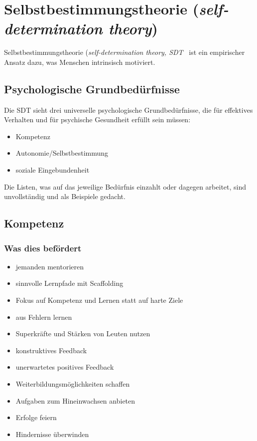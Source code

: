 \section{Selbstbestimmungstheorie (\emph{self-determination theory})}
\label{sdt}

Selbstbestimmungstheorie (\emph{self-determination theory, SDT}~\cite{self-determiniation-theory} ist ein empirischer Ansatz dazu, was Menschen intrinsisch motiviert.


\subsection{Psychologische Grundbedürfnisse}

Die SDT sieht drei universelle psychologische Grundbedürfnisse, die für effektives Verhalten und für psychische Gesundheit erfüllt sein müssen:

\begin{itemize}
  \item Kompetenz
  \item Autonomie/Selbstbestimmung
  \item soziale Eingebundenheit
\end{itemize}

Die Listen, was auf das jeweilige Bedürfnis einzahlt oder dagegen arbeitet, sind unvollständig und als Beispiele gedacht.


\subsection{Kompetenz}

\subsubsection{Was dies befördert}

\begin{itemize}
  \item jemanden mentorieren
  \item sinnvolle Lernpfade mit \glqq Scaffolding\grqq
  \item Fokus auf Kompetenz und Lernen statt auf harte Ziele
  \item aus Fehlern lernen
  \item Superkräfte und Stärken von Leuten nutzen
  \item konstruktives Feedback
  \item unerwartetes positives Feedback
  \item Weiterbildungsmöglichkeiten schaffen
  \item Aufgaben zum Hineinwachsen anbieten
  \item Erfolge feiern
  \item Hindernisse überwinden
\end{itemize}

